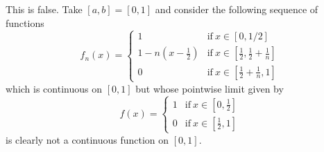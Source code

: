\documentclass[a4paper]{article}
\begin{document}
\begin{problem}
\begin{enumerate}
\begin{solution}
                This is false. Take \( [a,b] = [0,1] \) and consider the following sequence of functions
            \[  {f}_{n}(x) = 
            \begin{cases}
                1 &\text{if} \ x \in [0,1/2] \\
                1 - n (x - \frac{ 1 }{ 2 } ) &\text{if} \ x \in [\frac{ 1 }{ 2 }  , \frac{ 1 }{ 2 }  + \frac{ 1 }{ n }] \\
                0 &\text{if} \ x \in [\frac{ 1 }{ 2 }  + \frac{ 1 }{ n }  , 1 ]
            \end{cases}  \]
            which is continuous on \( [0,1] \) but whose pointwise limit given by
            \[  f(x) = 
            \begin{cases}
                1 &\text{if} \ x \in [0,\frac{ 1 }{ 2 }] \\
                0 &\text{if} \ x \in [\frac{ 1 }{ 2 } , 1 ]
            \end{cases} \]
        is clearly not a continuous function on \( [0,1] \).
            \end{solution}
    \end{enumerate}
\end{problem}
\end{document}
